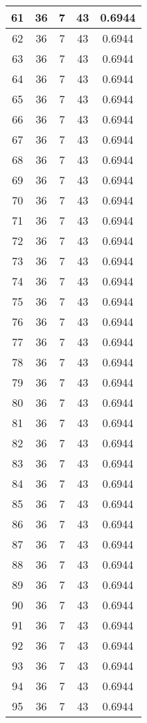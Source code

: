 \documentclass[letterpaper, 12pt]{article}
\begin{document}
\begin{longtable}{|c|c|c|c|c|}
61 & 36 & 7 & 43 & 0.6944 \\
\hline
62 & 36 & 7 & 43 & 0.6944 \\
\hline
63 & 36 & 7 & 43 & 0.6944 \\
\hline
64 & 36 & 7 & 43 & 0.6944 \\
\hline
65 & 36 & 7 & 43 & 0.6944 \\
\hline
66 & 36 & 7 & 43 & 0.6944 \\
\hline
67 & 36 & 7 & 43 & 0.6944 \\
\hline
68 & 36 & 7 & 43 & 0.6944 \\
\hline
69 & 36 & 7 & 43 & 0.6944 \\
\hline
70 & 36 & 7 & 43 & 0.6944 \\
\hline
71 & 36 & 7 & 43 & 0.6944 \\
\hline
72 & 36 & 7 & 43 & 0.6944 \\
\hline
73 & 36 & 7 & 43 & 0.6944 \\
\hline
74 & 36 & 7 & 43 & 0.6944 \\
\hline
75 & 36 & 7 & 43 & 0.6944 \\
\hline
76 & 36 & 7 & 43 & 0.6944 \\
\hline
77 & 36 & 7 & 43 & 0.6944 \\
\hline
78 & 36 & 7 & 43 & 0.6944 \\
\hline
79 & 36 & 7 & 43 & 0.6944 \\
\hline
80 & 36 & 7 & 43 & 0.6944 \\
\hline
81 & 36 & 7 & 43 & 0.6944 \\
\hline
82 & 36 & 7 & 43 & 0.6944 \\
\hline
83 & 36 & 7 & 43 & 0.6944 \\
\hline
84 & 36 & 7 & 43 & 0.6944 \\
\hline
85 & 36 & 7 & 43 & 0.6944 \\
\hline
86 & 36 & 7 & 43 & 0.6944 \\
\hline
87 & 36 & 7 & 43 & 0.6944 \\
\hline
88 & 36 & 7 & 43 & 0.6944 \\
\hline
89 & 36 & 7 & 43 & 0.6944 \\
\hline
90 & 36 & 7 & 43 & 0.6944 \\
\hline
91 & 36 & 7 & 43 & 0.6944 \\
\hline
92 & 36 & 7 & 43 & 0.6944 \\
\hline
93 & 36 & 7 & 43 & 0.6944 \\
\hline
94 & 36 & 7 & 43 & 0.6944 \\
\hline
95 & 36 & 7 & 43 & 0.6944 \\

\end{longtable}
\end{document}
